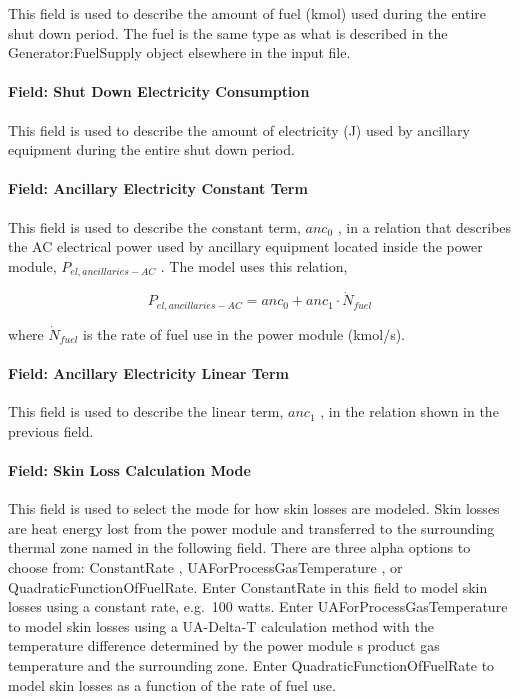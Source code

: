 This field is used to describe the amount of fuel (kmol) used during the entire shut down period. The fuel is the same type as what is described in the Generator:FuelSupply object elsewhere in the input file.

\paragraph{Field: Shut Down Electricity Consumption}\label{field-shut-down-electricity-consumption}

This field is used to describe the amount of electricity (J) used by ancillary equipment during the entire shut down period.

\paragraph{Field: Ancillary Electricity Constant Term}\label{field-ancillary-electricity-constant-term}

This field is used to describe the constant term, \(an{c_0}\) , in a relation that describes the AC electrical power used by ancillary equipment located inside the power module, \({P_{el,ancillaries - AC}}\) . The model uses this relation,

\begin{equation}
{P_{el,ancillaries - AC}} = an{c_0} + an{c_1} \cdot {\dot N_{fuel}}
\end{equation}

where \({\dot N_{fuel}}\) is the rate of fuel use in the power module (kmol/s).

\paragraph{Field: Ancillary Electricity Linear Term}\label{field-ancillary-electricity-linear-term}

This field is used to describe the linear term, \(an{c_1}\) , in the relation shown in the previous field.

\paragraph{Field: Skin Loss Calculation Mode}\label{field-skin-loss-calculation-mode}

This field is used to select the mode for how skin losses are modeled. Skin losses are heat energy lost from the power module and transferred to the surrounding thermal zone named in the following field. There are three alpha options to choose from: ConstantRate , UAForProcessGasTemperature , or QuadraticFunctionOfFuelRate. Enter ConstantRate in this field to model skin losses using a constant rate, e.g.~100 watts. Enter UAForProcessGasTemperature to model skin losses using a UA-Delta-T calculation method with the temperature difference determined by the power module s product gas temperature and the surrounding zone. Enter QuadraticFunctionOfFuelRate to model skin losses as a function of the rate of fuel use.

